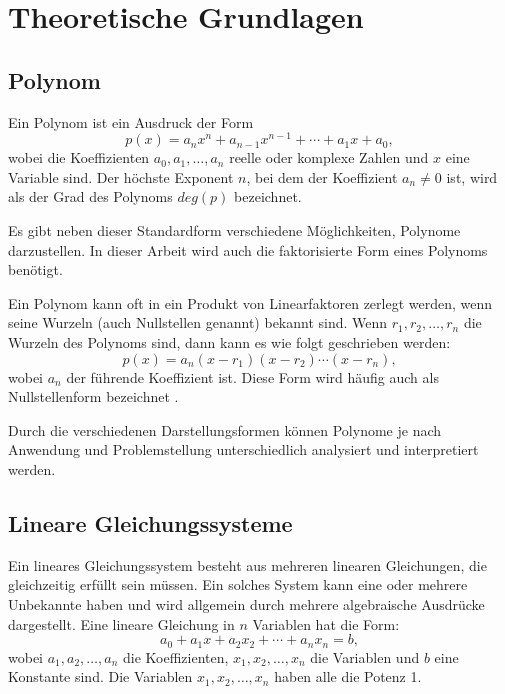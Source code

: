 \chapter{Theoretische Grundlagen}\label{ch:foundation}

\section{Polynom}\label{sec:polynom}

Ein Polynom ist ein Ausdruck der Form
\[
p(x) = a_n x^n + a_{n-1} x^{n-1} + \cdots + a_1 x + a_0,
\]
wobei die Koeffizienten \( a_0, a_1, \ldots, a_n \) reelle oder komplexe Zahlen und \( x \) eine Variable sind. 
Der höchste Exponent \( n \), bei dem der Koeffizient \( a_n \neq 0 \) ist, wird als der Grad des Polynoms $deg(p)$ bezeichnet.

Es gibt neben dieser Standardform verschiedene Möglichkeiten, Polynome darzustellen. 
In dieser Arbeit wird auch die faktorisierte Form eines Polynoms benötigt.

Ein Polynom kann oft in ein Produkt von Linearfaktoren zerlegt werden, wenn seine Wurzeln (auch Nullstellen genannt) bekannt sind. Wenn \( r_1, r_2, \ldots, r_n \) die Wurzeln des Polynoms sind, dann kann es wie folgt geschrieben werden:
\[
p(x) = a_n (x - r_1)(x - r_2) \cdots (x - r_n),
\]
wobei \( a_n \) der führende Koeffizient ist.
Diese Form wird häufig auch als Nullstellenform bezeichnet \cite{weitzKonkreteMathematikNicht2021}.


Durch die verschiedenen Darstellungsformen können Polynome je nach Anwendung und Problemstellung unterschiedlich analysiert und interpretiert werden.

\section{Lineare Gleichungssysteme}\label{sec:equationSystem}

Ein lineares Gleichungssystem besteht aus mehreren linearen Gleichungen, die gleichzeitig erfüllt sein müssen. 
Ein solches System kann eine oder mehrere Unbekannte haben und wird allgemein durch mehrere algebraische Ausdrücke dargestellt. 
Eine lineare Gleichung in \( n \) Variablen hat die Form:
\[
a_0 + a_1 x + a_2 x_2 + \cdots + a_n x_n = b,
\]
wobei \( a_1, a_2, \ldots, a_n \) die Koeffizienten, \( x_1, x_2, \ldots, x_n \) die Variablen und \( b \) eine Konstante sind. 
Die Variablen \( x_1, x_2, \ldots, x_n \) haben alle die Potenz 1.

